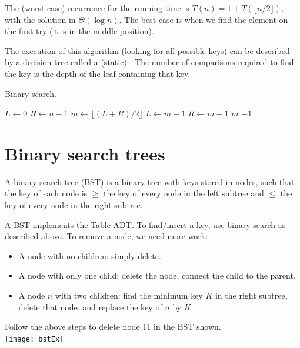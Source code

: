 The (worst-case) recurrence for the running time is $T(n) = 1 +  T(\lfloor n/2 \rfloor)$, with the
solution in $\Theta(\log n)$. 
The best case is when we find the element on the first try (it is in the middle position).

The execution of this algorithm (looking for all possible keys) can be 
described by a decision tree called a (static) . 
The number of comparisons required to find the key is the depth of the leaf containing that key.

\begin{algorithm}[H]
  \caption{Binary search.}
    \label{alg:binsearch}
\begin{algorithmic}[1]
	\State $L \gets 0$
	\State $R \gets n - 1$
		\State $m \gets \lfloor (L + R)/2 \rfloor$ 
			\State $L \gets m + 1$
			\State $R \gets m - 1$
		\Else 
			\State \Return $m$ 
		\EndIf
	\EndWhile
	\Return $-1$ 
\EndFunction
\end{algorithmic}
\end{algorithm}

\section{Binary search trees}
\begin{Definition}
A {binary search tree} (BST) is a binary tree with keys stored in nodes, 
such that the key of each node is $\geq$ the key of every node in the left subtree and $\leq$ 
the key of  every node in the right subtree.
\end{Definition}

A BST implements the Table ADT. 
To find/insert a key, use binary search as described above. 
To remove a node, we need more work:
\begin{itemize}
\item A node with no children: simply delete.
\item A node with only one child: delete the node, connect the child 
to the parent.
\item A node $n$ with two children: find the minimum key $K$ in the 
right subtree, delete that node, and replace the key of $n$ by $K$.
\end{itemize}

\begin{Boxample}[1] \label{eg:bstDeleteRight}
Follow the above steps to delete node $11$ in the BST shown.\\
\newline
\texttt{[image: bstEx]}
\end{Boxample}


